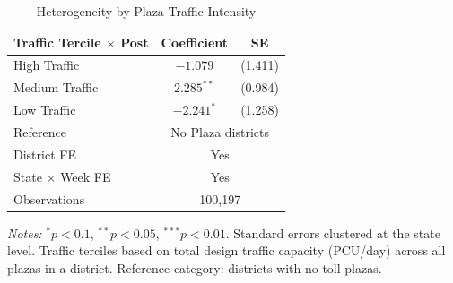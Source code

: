 \begin{table}[t]
\centering
\caption{Heterogeneity by Plaza Traffic Intensity}
\label{tab:heterogeneity}
\small
\begin{tabular}{lcc}
\toprule
Traffic Tercile $\times$ Post & Coefficient & SE \\
\midrule
High Traffic & $-1.079$ & (1.411) \\
Medium Traffic & $2.285^{**}$ & (0.984) \\
Low Traffic & $-2.241^{*}$ & (1.258) \\
\addlinespace
Reference & \multicolumn{2}{c}{No Plaza districts} \\
District FE & \multicolumn{2}{c}{Yes} \\
State $\times$ Week FE & \multicolumn{2}{c}{Yes} \\
Observations & \multicolumn{2}{c}{100,197} \\
\bottomrule
\end{tabular}
\begin{tablenotes}
\item \textit{Notes:} $^{*}p<0.1$, $^{**}p<0.05$, $^{***}p<0.01$. Standard errors clustered at the state level. Traffic terciles based on total design traffic capacity (PCU/day) across all plazas in a district. Reference category: districts with no toll plazas.
\end{tablenotes}
\end{table}

